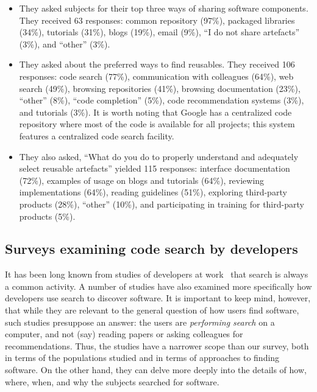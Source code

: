 \documentclass{casicswhitepaper}
\begin{document}
\begin{itemize}

\item They asked subjects for their top three ways of sharing software components.  They received 63 responses: common repository (97\%), packaged libraries (34\%), tutorials (31\%), blogs (19\%), email (9\%), ``I do not share artefacts'' (3\%), and ``other'' (3\%).

\item They asked about the preferred ways to find reusables.  They received 106 responses: code search (77\%), communication with colleagues (64\%), web search (49\%), browsing repositories (41\%), browsing documentation (23\%), ``other'' (8\%), ``code completion'' (5\%), code recommendation systems (3\%), and tutorials (3\%).  It is worth noting that Google has a centralized code repository where most of the code is available for all projects; this system features a centralized code search facility.

\item They also asked, ``What do you do to properly understand and adequately select reusable artefacts'' yielded 115 responses: interface documentation (72\%), examples of usage on blogs and tutorials (64\%), reviewing implementations (64\%), reading guidelines (51\%), exploring third-party products (28\%), ``other'' (10\%), and participating in training for third-party products (5\%).

\end{itemize}


\subsection{Surveys examining code search by developers}

It has been long known from studies of developers at work~\cite[e.g.,][]{singer1997examination} that search is always a common activity.  A number of studies have also examined more specifically how developers use search to discover software.  It is important to keep mind, however, that while they are relevant to the general question of how users find software, such studies presuppose an answer: the users are \emph{performing search} on a computer, and not (say) reading papers or asking colleagues for recommendations.  Thus, the studies have a narrower scope than our survey, both in terms of the populations studied and in terms of approaches to finding software.  On the other hand, they can delve more deeply into the details of how, where, when, and why the subjects searched for software.
\end{document}
